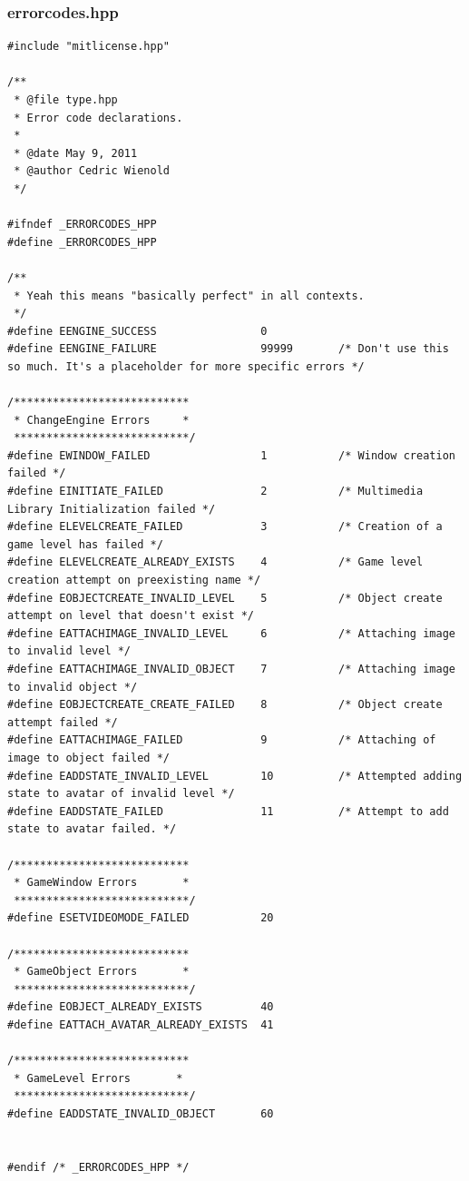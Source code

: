 \documentclass[12pt]{article}
\begin{document}
\subsubsection{errorcodes.hpp}
\begin{lstlisting}[breaklines]
#include "mitlicense.hpp"

/**
 * @file type.hpp
 * Error code declarations.
 *
 * @date May 9, 2011
 * @author Cedric Wienold
 */

#ifndef _ERRORCODES_HPP
#define _ERRORCODES_HPP

/**
 * Yeah this means "basically perfect" in all contexts.
 */
#define EENGINE_SUCCESS                0
#define EENGINE_FAILURE                99999       /* Don't use this so much. It's a placeholder for more specific errors */

/***************************
 * ChangeEngine Errors     *
 ***************************/
#define EWINDOW_FAILED                 1           /* Window creation failed */
#define EINITIATE_FAILED               2           /* Multimedia Library Initialization failed */
#define ELEVELCREATE_FAILED            3           /* Creation of a game level has failed */
#define ELEVELCREATE_ALREADY_EXISTS    4           /* Game level creation attempt on preexisting name */
#define EOBJECTCREATE_INVALID_LEVEL    5           /* Object create attempt on level that doesn't exist */
#define EATTACHIMAGE_INVALID_LEVEL     6           /* Attaching image to invalid level */
#define EATTACHIMAGE_INVALID_OBJECT    7           /* Attaching image to invalid object */
#define EOBJECTCREATE_CREATE_FAILED    8           /* Object create attempt failed */
#define EATTACHIMAGE_FAILED            9           /* Attaching of image to object failed */
#define EADDSTATE_INVALID_LEVEL        10          /* Attempted adding state to avatar of invalid level */
#define EADDSTATE_FAILED               11          /* Attempt to add state to avatar failed. */

/***************************
 * GameWindow Errors       *
 ***************************/
#define ESETVIDEOMODE_FAILED           20

/***************************
 * GameObject Errors       *
 ***************************/
#define EOBJECT_ALREADY_EXISTS         40
#define EATTACH_AVATAR_ALREADY_EXISTS  41

/***************************
 * GameLevel Errors       *
 ***************************/
#define EADDSTATE_INVALID_OBJECT       60


#endif /* _ERRORCODES_HPP */
\end{lstlisting}
\end{document}

